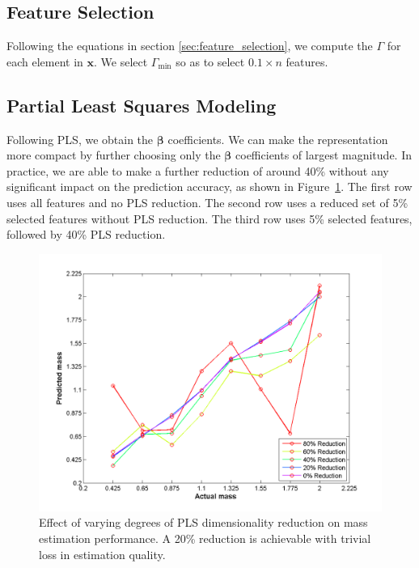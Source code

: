 \subsection{Feature Selection}

Following the equations in section \ref{sec:feature_selection}, we compute the $\Gamma$ for each element in $\mathbf{x}$.
We select $\Gamma_{\min}$ so as to select $0.1 \times n$ features.%

\subsection{Partial Least Squares Modeling}
Following PLS, we obtain the $\mathbf{\beta}$ coefficients.
We can make the representation more compact by further choosing only the $\mathbf{\beta}$ coefficients of largest magnitude.
In practice, we are able to make a further reduction of around 40\% without any significant impact on the prediction accuracy, as shown in Figure~\ref{fig:beta_reduc_comp}.
The first row uses all features and no PLS reduction.  
The second row uses a reduced set of 5\% selected features without PLS reduction. 
The third row uses 5\% selected features, followed by 40\% PLS reduction. 

\begin{figure}[]
	\centering
	\includegraphics[width=\linewidth]{images/beta_reduc_comp}
	\caption{Effect of varying degrees of PLS dimensionality reduction on mass estimation performance. A 20\% reduction is achievable with trivial loss in estimation quality.}
	\label{fig:beta_reduc_comp}
\end{figure}

